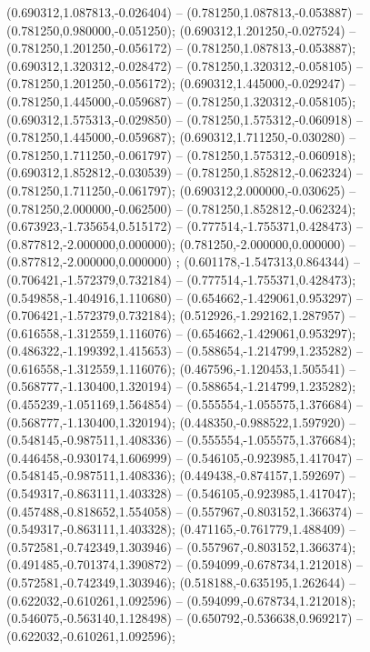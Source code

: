  (0.690312,1.087813,-0.026404) -- (0.781250,1.087813,-0.053887) -- (0.781250,0.980000,-0.051250);
 (0.690312,1.201250,-0.027524) -- (0.781250,1.201250,-0.056172) -- (0.781250,1.087813,-0.053887);
 (0.690312,1.320312,-0.028472) -- (0.781250,1.320312,-0.058105) -- (0.781250,1.201250,-0.056172);
 (0.690312,1.445000,-0.029247) -- (0.781250,1.445000,-0.059687) -- (0.781250,1.320312,-0.058105);
 (0.690312,1.575313,-0.029850) -- (0.781250,1.575312,-0.060918) -- (0.781250,1.445000,-0.059687);
 (0.690312,1.711250,-0.030280) -- (0.781250,1.711250,-0.061797) -- (0.781250,1.575312,-0.060918);
 (0.690312,1.852812,-0.030539) -- (0.781250,1.852812,-0.062324) -- (0.781250,1.711250,-0.061797);
 (0.690312,2.000000,-0.030625) -- (0.781250,2.000000,-0.062500) -- (0.781250,1.852812,-0.062324);
 (0.673923,-1.735654,0.515172) -- (0.777514,-1.755371,0.428473) -- (0.877812,-2.000000,0.000000);
 (0.781250,-2.000000,0.000000) -- (0.877812,-2.000000,0.000000) ;
 (0.601178,-1.547313,0.864344) -- (0.706421,-1.572379,0.732184) -- (0.777514,-1.755371,0.428473);
 (0.549858,-1.404916,1.110680) -- (0.654662,-1.429061,0.953297) -- (0.706421,-1.572379,0.732184);
 (0.512926,-1.292162,1.287957) -- (0.616558,-1.312559,1.116076) -- (0.654662,-1.429061,0.953297);
 (0.486322,-1.199392,1.415653) -- (0.588654,-1.214799,1.235282) -- (0.616558,-1.312559,1.116076);
 (0.467596,-1.120453,1.505541) -- (0.568777,-1.130400,1.320194) -- (0.588654,-1.214799,1.235282);
 (0.455239,-1.051169,1.564854) -- (0.555554,-1.055575,1.376684) -- (0.568777,-1.130400,1.320194);
 (0.448350,-0.988522,1.597920) -- (0.548145,-0.987511,1.408336) -- (0.555554,-1.055575,1.376684);
 (0.446458,-0.930174,1.606999) -- (0.546105,-0.923985,1.417047) -- (0.548145,-0.987511,1.408336);
 (0.449438,-0.874157,1.592697) -- (0.549317,-0.863111,1.403328) -- (0.546105,-0.923985,1.417047);
 (0.457488,-0.818652,1.554058) -- (0.557967,-0.803152,1.366374) -- (0.549317,-0.863111,1.403328);
 (0.471165,-0.761779,1.488409) -- (0.572581,-0.742349,1.303946) -- (0.557967,-0.803152,1.366374);
 (0.491485,-0.701374,1.390872) -- (0.594099,-0.678734,1.212018) -- (0.572581,-0.742349,1.303946);
 (0.518188,-0.635195,1.262644) -- (0.622032,-0.610261,1.092596) -- (0.594099,-0.678734,1.212018);
 (0.546075,-0.563140,1.128498) -- (0.650792,-0.536638,0.969217) -- (0.622032,-0.610261,1.092596);
